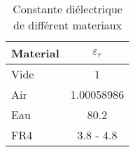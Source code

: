 \begin{table}
    \caption{Constante diélectrique de différent materiaux}
    \label{tab:speed-of-light}
    \begin{tabular}{l | c}
        \toprule
        Material & $\varepsilon_r$ \\
        \midrule
        \hline
        Vide & 1\\
        Air  & 1.00058986\\
        Eau  & 80.2\\
        FR4  & 3.8 - 4.8\\
        \bottomrule
    \end{tabular}
\end{table}